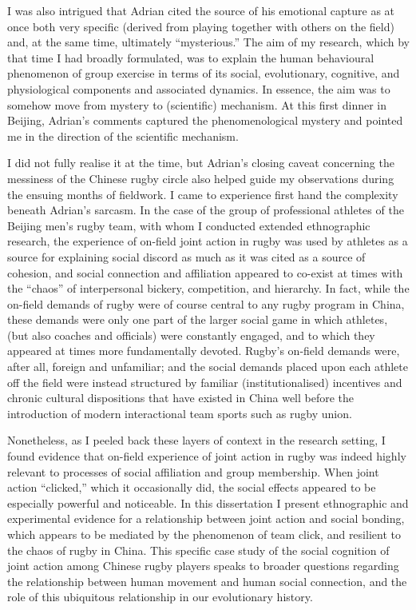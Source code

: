 \begin{CJK}{UTF8}{gbsn}
I was also intrigued that Adrian cited the source of his emotional capture as at once both very specific (derived from playing together with others on the field) and, at the same time, ultimately ``mysterious.''  The aim of my research, which by that time I had broadly formulated, was to explain the human behavioural phenomenon of group exercise in terms of its social, evolutionary, cognitive, and physiological components and associated dynamics.  In essence, the aim was to somehow move from mystery to (scientific) mechanism.  At this first dinner in Beijing, Adrian's comments captured the phenomenological mystery and pointed me in the direction of the scientific mechanism.

I did not fully realise it at the time, but Adrian's closing caveat concerning the messiness of the Chinese rugby circle also helped guide my observations during the ensuing months of fieldwork.  I came to experience first hand the complexity beneath Adrian's sarcasm.  In the case of the group of professional athletes of the Beijing men's rugby team, with whom I conducted extended ethnographic research, the experience of on-field joint action in rugby was used by athletes as a source for explaining social discord as much as it was cited as a source of cohesion, and social connection and affiliation appeared to co-exist at times with the ``chaos'' of interpersonal bickery, competition, and hierarchy.  In fact, while the on-field demands of rugby were of course central to any rugby program in China, these demands were only one part of the larger social game in which athletes, (but also coaches and officials) were constantly engaged, and to which they appeared at times more fundamentally devoted. Rugby's on-field demands were, after all, foreign and unfamiliar; and the social demands placed upon each athlete off the field were instead structured by familiar (institutionalised) incentives and chronic cultural dispositions that have existed in China well before the introduction of modern interactional team sports such as rugby union.

Nonetheless, as I peeled back these layers of context in the research setting, I found evidence that on-field experience of joint action in rugby was indeed highly relevant to processes of social affiliation and group membership. When joint action ``clicked,'' which it occasionally did,  the social effects appeared to be especially powerful and noticeable.   In this dissertation I present ethnographic and experimental evidence for a relationship between joint action and social bonding, which appears to be mediated by the phenomenon of team click, and resilient to the chaos of rugby in China.  This specific case study of the social cognition of joint action among Chinese rugby players speaks to broader questions regarding the relationship between human movement and human social connection, and the role of this ubiquitous relationship in our evolutionary history.


\end{CJK}
